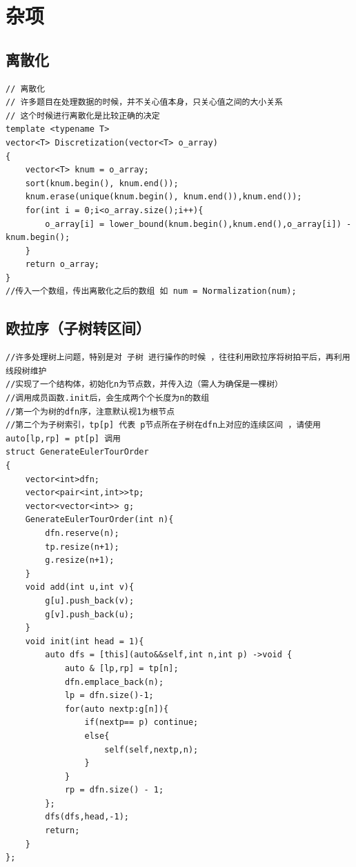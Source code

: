 \section{杂项}

\subsection{离散化}

\begin{lstlisting}
// 离散化
// 许多题目在处理数据的时候，并不关心值本身，只关心值之间的大小关系
// 这个时候进行离散化是比较正确的决定
template <typename T> 
vector<T> Discretization(vector<T> o_array)
{
    vector<T> knum = o_array;
    sort(knum.begin(), knum.end());
    knum.erase(unique(knum.begin(), knum.end()),knum.end());
    for(int i = 0;i<o_array.size();i++){
        o_array[i] = lower_bound(knum.begin(),knum.end(),o_array[i]) - knum.begin();
    }
    return o_array;
}
//传入一个数组，传出离散化之后的数组 如 num = Normalization(num);
\end{lstlisting}

\subsection{欧拉序（子树转区间）}

\begin{lstlisting}
//许多处理树上问题，特别是对 子树 进行操作的时候 ，往往利用欧拉序将树拍平后，再利用线段树维护
//实现了一个结构体，初始化n为节点数，并传入边（需人为确保是一棵树）
//调用成员函数.init后，会生成两个个长度为n的数组
//第一个为树的dfn序，注意默认视1为根节点
//第二个为子树索引，tp[p] 代表 p节点所在子树在dfn上对应的连续区间 ，请使用auto[lp,rp] = pt[p] 调用
struct GenerateEulerTourOrder
{
    vector<int>dfn;
    vector<pair<int,int>>tp;
    vector<vector<int>> g;
    GenerateEulerTourOrder(int n){
        dfn.reserve(n);
        tp.resize(n+1);
        g.resize(n+1);
    }
    void add(int u,int v){
        g[u].push_back(v);
        g[v].push_back(u);
    }
    void init(int head = 1){
        auto dfs = [this](auto&&self,int n,int p) ->void {
            auto & [lp,rp] = tp[n];
            dfn.emplace_back(n);
            lp = dfn.size()-1;
            for(auto nextp:g[n]){
                if(nextp== p) continue;
                else{
                    self(self,nextp,n);
                }
            }
            rp = dfn.size() - 1;
        };
        dfs(dfs,head,-1);
        return;
    }
};
\end{lstlisting}

